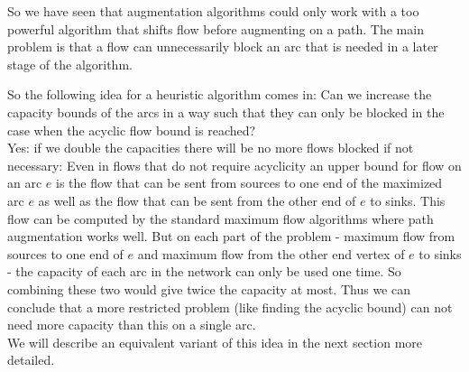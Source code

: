 So we have seen that augmentation algorithms could only work with a too powerful algorithm that shifts flow before 
augmenting on a path. The main problem is that a flow can unnecessarily block an arc that is needed in a later stage 
of the algorithm. 

So the following idea for a heuristic algorithm comes in: Can we increase the capacity bounds of the arcs in a way 
such that they can only be blocked in the case when the acyclic flow bound is reached?\\

Yes: if we double the capacities there will be no more flows blocked if not necessary: Even in flows that do not 
require acyclicity an upper bound for flow on an arc $e$ is the flow that can be sent from sources to one end of the 
maximized arc $e$ as well as the flow that can be sent from the other end of $e$ to sinks. This flow can be computed by 
the standard maximum flow algorithms where path augmentation works well. But on each part of the problem - maximum flow 
from sources to one end of $e$ and maximum flow from the other end vertex of $e$ to sinks - the capacity of each arc in 
the network can only be used one time. So combining these two would give twice the capacity at most. Thus we can 
conclude that a more restricted problem (like finding the acyclic bound) can not need more capacity than this on a 
single arc.\\

We will describe an equivalent variant of this idea in the next section more detailed.


